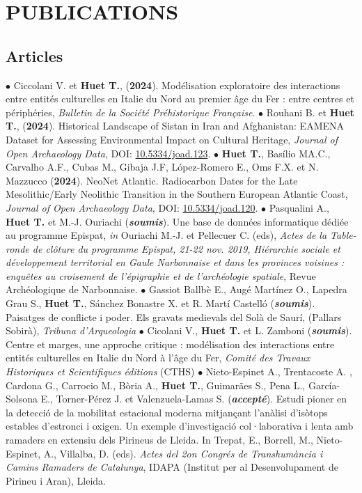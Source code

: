 \documentclass{article}
\newcommand{\fr}[1]{} %
\newcommand{\en}[1]{#1}   %
\begin{document}
\section{PUBLICATIONS}

\subsection*{\fr{Articles}\en{Articles}}
$\bullet$ Ciccolani V. et \textbf{Huet T.}, (\textbf{2024}). Modélisation exploratoire des interactions entre entités culturelles en Italie du Nord au premier âge du Fer : entre centres et périphéries, \textit{Bulletin de la Soci\'{e}t\'{e} Pr\'{e}historique Fran\c{c}aise}.
\smallbreak
$\bullet$ Rouhani B. et \textbf{Huet T.}, (\textbf{2024}). Historical Landscape of Sistan in Iran and Afghanistan: EAMENA Dataset for Assessing Environmental Impact on Cultural Heritage, \textit{Journal of Open Archaeology Data}, DOI: \href{https://openarchaeologydata.metajnl.com/articles/10.5334/joad.123}{10.5334/joad.123}.
\smallbreak
$\bullet$ \textbf{Huet T.}, Basílio MA.C., Carvalho A.F., Cubas M., Gibaja J.F, López-Romero E., Oms F.X. et N. Mazzucco (\textbf{2024}). NeoNet Atlantic. Radiocarbon Dates for the Late Mesolithic/Early Neolithic Transition in the Southern European Atlantic Coast, \textit{Journal of Open Archaeology Data}, DOI: \href{https://openarchaeologydata.metajnl.com/articles/10.5334/joad.120}{10.5334/joad.120}.
\smallbreak
$\bullet$ Pasqualini A., \textbf{Huet T.} et M.-J. Ouriachi (\textit{\textbf{soumis}}). Une base de données informatique dédiée au programme Epispat, \textit{in} Ouriachi M.-J. et Pellecuer C. (eds), \textit{Actes de la Table-ronde de cl\^{o}ture du programme Epispat, 21-22 nov. 2019, Hi\'{e}rarchie sociale et d\'{e}veloppement territorial en Gaule Narbonnaise et dans les provinces voisines : enqu\^{e}tes au croisement de l'\'{e}pigraphie et de l'arch\'{e}ologie spatiale}, Revue Arch\'{e}ologique de Narbonnaise.
\smallbreak
$\bullet$ Gassiot Ballbè E., Augé Martínez O., Lapedra Grau S., \textbf{Huet T.}, Sánchez Bonastre X. et R. Martí Castelló (\textit{\textbf{soumis}}). Paisatges de conflicte i poder. Els gravats medievals del Solà de Saurí, (Pallars Sobirà), \textit{Tribuna d'Arqueologia}
\smallbreak
$\bullet$ Cicolani V., \textbf{Huet T.} et L. Zamboni (\textit{\textbf{soumis}}). Centre et marges, une approche critique : modélisation des interactions entre entités culturelles en Italie du Nord à l'âge du Fer, \textit{Comit\'{e} des Travaux Historiques et Scientifiques \'{e}ditions} (CTHS)
\smallbreak
$\bullet$ Nieto-Espinet A., Trentacoste A. , Cardona G., Carrocio M.,  Bòria A., \textbf{Huet T.}, Guimarães S., Pena L., García-Solsona E., Torner-Pérez J. et  Valenzuela-Lamas S. (\textit{\textbf{accepté}}). Estudi pioner en la detecció de la mobilitat estacional moderna mitjançant l'anàlisi d'isòtops estables d'estronci i oxigen. Un exemple d'investigació col·laborativa i lenta amb ramaders en extensiu dels Pirineus de Lleida. In Trepat, E., Borrell, M., Nieto-Espinet, A., Villalba, D. (eds). \textit{Actes del 2on Congrés de Transhumància i Camins Ramaders de Catalunya}, IDAPA (Institut per al Desenvolupament de Pirineu i Aran), Lleida. 
\end{document}
